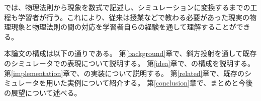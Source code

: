 \simname では、物理法則から現象を数式で記述し、シミュレーションに変換するまでの工程も学習者が行う。これにより、従来は授業などで教わる必要があった現実の物理現象と物理法則の間の対応を学習者自らの経験を通して理解することができる。

本論文の構成は以下の通りである。
第\ref{background}章で、斜方投射を通して既存のシミュレータでの表現について説明する。
第\ref{idea}章で、\simname の構成を説明する。
第\ref{implementation}章で、\simname の実装について説明する。
第\ref{related}章で、既存のシミュレータを用いた実例について紹介する。
第\ref{conclusion}章で、まとめと今後の展望について述べる。
